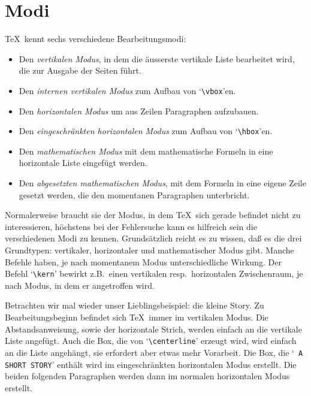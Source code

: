 \section{Modi}
\TeX\ kennt sechs verschiedene
Bearbeitungsmodi:
\begin{itemize}
\item Den {\em vertikalen Modus}, in dem die \"ausserste vertikale
Liste
bearbeitet wird, die zur Ausgabe der Seiten f\"uhrt.
\item Den {\em internen vertikalen Modus} zum Aufbau von
`\verb|\vbox|'en.
\item Den {\em horizontalen Modus} um aus Zeilen Paragraphen
aufzubauen.
\item Den {\em eingeschr\"ankten horizontalen Modus} zum Aufbau von
`\verb|\hbox|'en.
\item Den {\em mathematischen Modus} mit dem mathematische Formeln in
eine horizontale Liste eingef\"ugt werden.
\item Den {\em abgesetzten mathematischen Modus}, mit dem Formeln in
eine eigene Zeile gesetzt werden, die den momentanen Paragraphen
unterbricht.
\end{itemize}
Normalerweise braucht sie der Modus, in dem \TeX\ sich gerade befindet
nicht zu interessieren, h\"ochstens bei der 
Fehlersuche kann es
hilfreich sein die verschiedenen Modi zu kennen. Grunds\"atzlich reicht
es zu wissen, da\ss{} es die drei Grundtypen: vertikaler, horizontaler und
mathematischer 
Modus gibt. Manche Befehle haben, je nach momentanem
Modus unterschiedliche Wirkung. Der Befehl 
`\verb|\kern|' bewirkt
z.B.\ einen vertikalen resp.\ horizontalen 
Zwischenraum, je nach
Modus, in dem er angetroffen wird.

Betrachten wir mal wieder unser Lieblingsbeispiel: die kleine Story.
Zu Bearbeitungsbeginn befindet sich \TeX\ immer im vertikalen Modus.
Die 
Abstandsanweisung, sowie der 
horizontale Strich, werden einfach an
die vertikale 
Liste angef\"ugt. Auch die 
Box, die von 
`\verb|\centerline|' erzeugt wird, wird einfach an die Liste
angeh\"angt, sie erfordert aber etwas mehr Vorarbeit. Die Box, die `{\tt
A SHORT STORY}' enth\"alt wird im eingeschr\"ankten horizontalen Modus
erstellt. Die beiden folgenden Paragraphen werden dann im normalen
horizontalen Modus erstellt.

